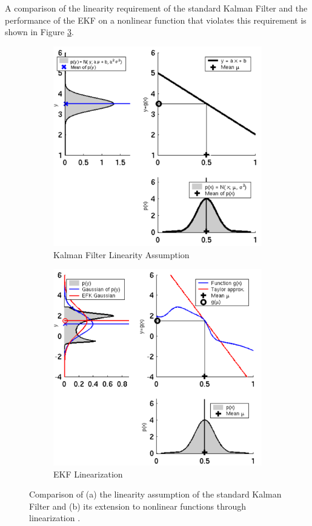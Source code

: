 \documentclass[twoside]{article}
\begin{document}
A comparison of the linearity requirement of the standard Kalman Filter and the performance of the EKF on a nonlinear function that violates this requirement is shown in Figure \ref{fig:KF_vs_EKF}.

\begin{figure}[tp]
\centering
\begin{subfigure}{.5\textwidth}
  \centering
  \includegraphics[width=.9\linewidth]{KF_linearity.png}
  \caption{Kalman Filter Linearity Assumption}
  \label{fig:KF_linearity}
\end{subfigure}%
\begin{subfigure}{.5\textwidth}
  \centering
  \includegraphics[width=.9\linewidth]{EKF_med_var.png}
  \caption{EKF Linearization}
  \label{fig:EKF_med_var}
\end{subfigure}
\caption{Comparison of (a) the linearity assumption of the standard Kalman Filter \cite{Xmisc} and (b) its extension to nonlinear functions through linearization \cite{Xmisc}.}
\label{fig:KF_vs_EKF}
\end{figure}
\end{document}
